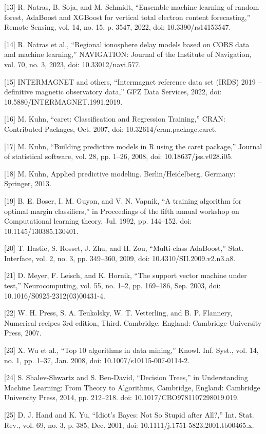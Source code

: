 \let\LaTeXcline\cline\documentclass[sn-mathphys-num]{sn-jnl}\let\cline\LaTeXcline
\begin{document}
[13] R. Natras, B. Soja, and M. Schmidt, “Ensemble machine learning of random forest, AdaBoost and XGBoost for vertical total electron content forecasting,” Remote Sensing, vol. 14, no. 15, p. 3547, 2022, doi: 10.3390/rs14153547.

[14] R. Natras et al., “Regional ionosphere delay models based on CORS data and machine learning,” NAVIGATION: Journal of the Institute of Navigation, vol. 70, no. 3, 2023, doi: 10.33012/navi.577.

[15] INTERMAGNET and others, “Intermagnet reference data set (IRDS) 2019 – definitive magnetic observatory data,” GFZ Data Services, 2022, doi: 10.5880/INTERMAGNET.1991.2019.

[16] M. Kuhn, “caret: Classification and Regression Training,” CRAN: Contributed Packages, Oct. 2007, doi: 10.32614/cran.package.caret.

[17] M. Kuhn, “Building predictive models in R using the caret package,” Journal of statistical software, vol. 28, pp. 1–26, 2008, doi: 10.18637/jss.v028.i05.

[18] M. Kuhn, Applied predictive modeling. Berlin/Heidelberg, Germany: Springer, 2013.

[19] B. E. Boser, I. M. Guyon, and V. N. Vapnik, “A training algorithm for optimal margin classifiers,” in Proceedings of the fifth annual workshop on Computational learning theory, Jul. 1992, pp. 144–152. doi: 10.1145/130385.130401.

[20] T. Hastie, S. Rosset, J. Zhu, and H. Zou, “Multi-class AdaBoost,” Stat. Interface, vol. 2, no. 3, pp. 349–360, 2009, doi: 10.4310/SII.2009.v2.n3.a8.

[21] D. Meyer, F. Leisch, and K. Hornik, “The support vector machine under test,” Neurocomputing, vol. 55, no. 1–2, pp. 169–186, Sep. 2003, doi: 10.1016/S0925-2312(03)00431-4.

[22] W. H. Press, S. A. Teukolsky, W. T. Vetterling, and B. P. Flannery, Numerical recipes 3rd edition, Third. Cambridge, England: Cambridge University Press, 2007.

[23] X. Wu et al., “Top 10 algorithms in data mining,” Knowl. Inf. Syst., vol. 14, no. 1, pp. 1–37, Jan. 2008, doi: 10.1007/s10115-007-0114-2.

[24] S. Shalev-Shwartz and S. Ben-David, “Decision Trees,” in Understanding Machine Learning: From Theory to Algorithms, Cambridge, England: Cambridge University Press, 2014, pp. 212–218. doi: 10.1017/CBO9781107298019.019.

[25] D. J. Hand and K. Yu, “Idiot’s Bayes: Not So Stupid after All?,” Int. Stat. Rev., vol. 69, no. 3, p. 385, Dec. 2001, doi: 10.1111/j.1751-5823.2001.tb00465.x.
\end{document}
